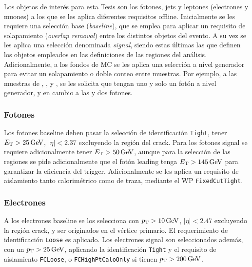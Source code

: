 Los objetos de interés para esta Tesis son los fotones, jets y leptones (electrones y muones) a los que se les aplica diferentes requisitos offline. Inicialmente se les requiere una selección base (\textit{baseline}),
que se emplea para aplicar un requisito de solapamiento (\textit{overlap removal}) entre los distintos objetos del evento.
A su vez se les aplica una selección denominada \textit{signal}, siendo estas últimas las que definen los objetos empleados en las definiciones de las regiones del análisis. Adicionalmente, a los fondos de MC se les aplica una selección a nivel generador para evitar un solapamiento o doble conteo entre muestras. Por ejemplo, a las muestras de \zph, \wph, \ttbarph y \phj, se les solicita que tengan uno y solo un fotón a nivel generador, y en cambio a las \zphph y \wphph dos fotones. 



\subsubsection{Fotones}

Los fotones baseline deben pasar la selección de identificación \texttt{Tight}, tener $E_{\text{T}}>25\,\text{GeV}$, $|\eta|<2.37$ excluyendo la región del crack. Para los fotones signal se requiere adicionalmente tener $E_{\text{T}}>50\,\text{GeV}$, aunque para la selección de las regiones se pide adicionalmente que el fotón leading tenga $E_{\text{T}}>145\,\text{GeV}$ para garantizar la eficiencia del trigger. Adicionalmente se les aplica un requisito de aislamiento tanto calorimétrico como de traza, mediante el WP \texttt{FixedCutTight}.


\subsubsection{Electrones}

A los electrones baseline se los selecciona con $p_{\text{T}}>10\,\text{GeV}$, $|\eta|<2.47$ excluyendo la región crack, y ser originados en el vértice primario. El requerimiento de identificación \texttt{Loose}
es aplicado. Los electrones signal son seleccionados además, con un $p_{\text{T}}>25\,\text{GeV}$, aplicando la identificación \texttt{Tight}
y el requisito de aislamiento \texttt{FCLoose}, o \texttt{FCHighPtCaloOnly} si tienen $p_{\text{T}}>200\,\text{GeV}$.


